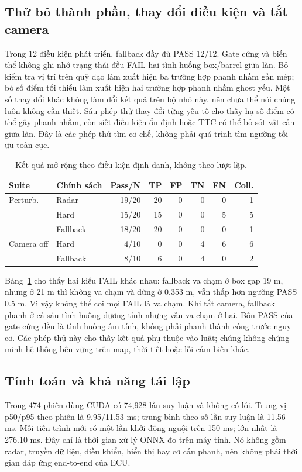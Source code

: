 \documentclass[conference]{IEEEtran}
\begin{document}
\subsection{Thử bỏ thành phần, thay đổi điều kiện và tắt camera}
Trong 12 điều kiện phát triển, fallback đầy đủ PASS 12/12. Gate cứng và biến
thể không ghi nhớ trạng thái đều FAIL hai tình huống box/barrel giữa làn. Bỏ
kiểm tra vị trí trên quỹ đạo làm xuất hiện ba trường hợp phanh nhầm gần mép;
bỏ số điểm tối thiểu làm xuất hiện hai trường hợp phanh nhầm ghost yếu.
Một số thay đổi khác không làm đổi kết quả trên bộ nhỏ này, nên chưa thể nói
chúng luôn không cần thiết. Sáu phép thử thay đổi từng yếu tố cho thấy hạ số
điểm có thể gây phanh nhầm, còn siết điều kiện ổn định hoặc TTC có thể bỏ sót
vật cản giữa làn. Đây là các phép thử tìm cơ chế, không phải quá trình tìm
ngưỡng tối ưu toàn cục.

\begin{table}[t]
\caption{Kết quả mở rộng theo điều kiện định danh, không theo lượt lặp.}
\label{tab:extended}
\centering\scriptsize
\setlength{\tabcolsep}{3pt}
\begin{tabular}{llrrrrrr}
\toprule Suite & Chính sách & Pass/N & TP & FP & TN & FN & Coll.\\ \midrule
Perturb. & Radar & 19/20 & 20 & 0 & 0 & 0 & 1\\
 & Hard & 15/20 & 15 & 0 & 0 & 5 & 5\\
 & Fallback & 18/20 & 20 & 0 & 0 & 0 & 1\\
\midrule
Camera off & Hard & 4/10 & 0 & 0 & 4 & 6 & 6\\
 & Fallback & 8/10 & 6 & 0 & 4 & 0 & 2\\
\bottomrule
\end{tabular}
\end{table}

Bảng~\ref{tab:extended} cho thấy hai kiểu FAIL khác nhau: fallback va chạm ở
box gap 19 m, nhưng ở 21 m thì không va chạm và dừng ở 0.353 m, vẫn thấp hơn
ngưỡng PASS 0.5 m. Vì vậy không thể coi mọi FAIL là va chạm. Khi tắt camera,
fallback phanh ở cả sáu tình huống dương tính nhưng vẫn va chạm ở hai. Bốn
PASS của gate cứng đều là tình huống âm tính, không phải phanh thành công
trước nguy cơ. Các phép thử này cho thấy kết quả phụ thuộc vào luật; chúng
không chứng minh hệ thống bền vững trên map, thời tiết hoặc lỗi cảm biến khác.

\subsection{Tính toán và khả năng tái lập}
Trong 474 phiên dùng CUDA có 74,928 lần suy luận và không có lỗi. Trung vị
p50/p95 theo phiên là 9.95/11.53 ms; trung bình theo số lần suy luận là
11.56 ms. Mỗi tiến trình mới có một lần khởi động nguội trên 150 ms; lớn nhất
là 276.10 ms. Đây chỉ là thời gian xử lý ONNX đo trên máy tính. Nó không gồm
radar, truyền dữ liệu, điều khiển, hiển thị hay cơ cấu phanh, nên không phải
thời gian đáp ứng end-to-end của ECU.
\end{document}
